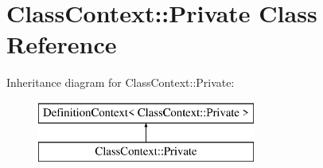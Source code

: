 \hypertarget{class_class_context_1_1_private}{}\section{Class\+Context\+::Private Class Reference}
\label{class_class_context_1_1_private}
Inheritance diagram for Class\+Context\+::Private\+:\begin{figure}[H]
\begin{center}
\leavevmode
\includegraphics[height=2.000000cm]{class_class_context_1_1_private}
\end{center}
\end{figure}
